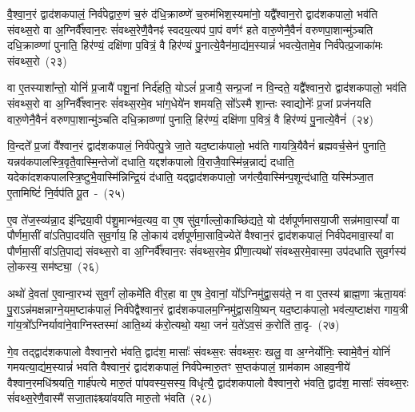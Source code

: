वै॒श्वा॒न॒रं द्वाद॑श\-कपालं॒ निर्व॑पेद्वारु॒णं च॒रुं द॑धि॒क्राव्ण्णे॑ च॒रुम॑भिश॒स्यमा॑नो॒ यद्वै᳚श्वान॒रो द्वाद॑श\-कपालो॒ भव॑ति संवथ्स॒रो वा अ॒ग्निर्वै᳚श्वान॒रः सं॑वथ्स॒रेणै॒वैनꣴ॑ स्वदय॒त्यप॑ पा॒पं वर्णꣳ॑ हते वारु॒णेनै॒वैनं॑ वरुणपा॒शान्मु॑ञ्चति दधि॒क्राव्ण्णा॑ पुनाति॒ हिर॑ण्यं॒ दक्षि॑णा प॒वित्रं॒ वै हिर॑ण्यं पु॒नात्ये॒वैन॑मा॒द्य॑म॒स्यान्नं॑ भवत्ये॒तामे॒व निर्व॑पेत्प्र॒जाका॑मः संवथ्स॒रो~(२३)\ip

वा ए॒तस्याशा᳚न्तो॒ योनिं॑ प्र॒जायै॑ पशू॒नां निर्द॑हति॒ यो\-ऽलं॑ प्र॒जायै॒ सन्प्र॒जां न वि॒न्दते॒ यद्वै᳚श्वान॒रो द्वाद॑श\-कपालो॒ भव॑ति संवथ्स॒रो वा अ॒ग्निर्वै᳚श्वान॒रः सं॑वथ्स॒रमे॒व भा॑ग॒धेये॑न शमयति॒ सो᳚\-ऽस्मै शा॒न्तः स्वाद्योनेः᳚ प्र॒जां प्रज॑नयति वारु॒णेनै॒वैनं॑ वरुणपा॒शान्मु॑ञ्चति दधि॒क्राव्ण्णा॑ पुनाति॒ हिर॑ण्यं॒ दक्षि॑णा प॒वित्रं॒ वै हिर॑ण्यं पु॒नात्ये॒वैनं॑~(२४)\ip

वि॒न्दते᳚ प्र॒जां वै᳚श्वान॒रं द्वाद॑श\-कपालं॒ निर्व॑पेत्पु॒त्रे जा॒ते यद॒ष्टाक॑पालो॒ भव॑ति गायत्रि॒यैवैनं॑ ब्रह्मवर्च॒सेन॑ पुनाति॒ यन्नव॑कपालस्त्रि॒वृतै॒वास्मि॒न्तेजो॑ दधाति॒ यद्दश॑\-कपालो वि॒राजै॒वास्मि॑न्न॒न्नाद्यं॑ दधाति॒ यदेका॑\-दश\-कपालस्त्रि॒ष्टुभै॒वा\-स्मि॑न्निन्द्रि॒यं द॑धाति॒ यद्द्वाद॑श\-कपालो॒ जग॑त्यै॒वास्मि॑न्प॒शून्द॑\-धाति॒ यस्मि॑ञ्जा॒त ए॒तामिष्टिं॑ नि॒र्वप॑ति पू॒त~-~(२५)\ip

ए॒व ते॑ज॒स्व्य॑न्ना॒द इ॑न्द्रिया॒वी प॑शु॒मान्भ॑व॒त्यव॒ वा ए॒ष सु॑व॒र्गाल्लो॒काच्छि॑द्यते॒ यो द॑र्\mbox{}शपूर्णमासया॒जी सन्न॑मावा॒स्यां᳚ वा पौर्णमा॒सीं वा॑\-ऽतिपा॒दय॑ति सुव॒र्गाय॒ हि लो॒काय॑ दर्\mbox{}श\-पूर्ण\-मा॒सावि॒ज्येते॑ वैश्वान॒रं द्वाद॑श\-कपालं॒ निर्व॑पेदमावा॒स्यां᳚ वा पौर्णमा॒सीं वा॑\-ऽति॒पाद्य॑ संवथ्स॒रो वा अ॒ग्निर्वै᳚श्वान॒रः सं॑वथ्स॒रमे॒व प्री॑णा॒त्यथो॑ संवथ्स॒रमे॒वास्मा॒ उप॑दधाति सुव॒र्गस्य॑ लो॒कस्य॒ सम॑ष्ट्या॒~(२६)\ip

अथो॑ दे॒वता॑ ए॒वान्वा॒रभ्य॑ सुव॒र्गं लो॒कमे॑ति वीर॒हा वा ए॒ष दे॒वानां॒ यो᳚\-ऽग्निमु॑द्वा॒सय॑ते॒ न वा ए॒तस्य॑ ब्राह्म॒णा ऋ॑ता॒यवः॑ पु॒रा\-ऽन्न॑मक्षन्नाग्ने॒यम॒ष्टा\-क॑पालं॒ निर्व॑पेद्वैश्वान॒रं द्वाद॑श\-कपालम॒ग्नि\-मु॑द्वासयि॒ष्यन् यद॒ष्टाक॑पालो॒ भव॑त्य॒ष्टाक्ष॑रा गाय॒त्री गा॑य॒त्रो᳚\-ऽग्निर्यावा॑ने॒वाग्निस्तस्मा॑ आति॒थ्यं क॑रो॒त्यथो॒ यथा॒ जनं॑ य॒ते॑\-ऽव॒सं क॒रोति॑ ता॒दृ-~(२७)\ip

गे॒व तद्द्वाद॑श\-कपालो वैश्वान॒रो भ॑वति॒ द्वाद॑श॒ मासाः᳚ संवथ्स॒रः सं॑वथ्स॒रः खलु॒ वा अ॒ग्नेर्योनिः॒ स्वामे॒वैनं॒ योनिं॑ गमयत्या॒द्य॑म॒स्यान्नं॑ भवति वैश्वान॒रं द्वाद॑श\-कपालं॒ निर्व॑पेन्मारु॒तꣳ स॒प्तक॑पालं॒ ग्राम॑काम आहव॒नीये॑ वैश्वान॒रमधि॑श्रयति॒ गार्\mbox{}ह॑पत्ये मारु॒तं पा॑पवस्य॒सस्य॒ विधृ॑त्यै॒ द्वाद॑श\-कपालो वैश्वान॒रो भ॑वति॒ द्वाद॑श॒ मासाः᳚ संवथ्स॒रः सं॑वथ्स॒रेणै॒वास्मै॑ सजा॒ताꣴश्च्या॑वयति मारु॒तो भ॑वति~(२८)\ip

